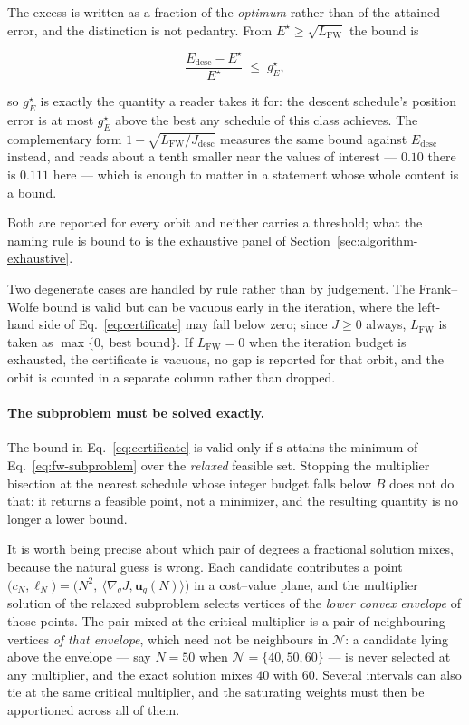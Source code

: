 The excess is written as a fraction of the \emph{optimum} rather than of the
attained error, and the distinction is not pedantry. From
$E^{\star}\ge\sqrt{L_{\mathrm{FW}}}$ the bound is

\begin{equation}
  \frac{E_{\mathrm{desc}}-E^{\star}}{E^{\star}} \;\le\; g_E^{\star} ,
  \label{eq:relative-excess}
\end{equation}

so $g_E^{\star}$ is exactly the quantity a reader takes it for: the descent
schedule's position error is at most $g_E^{\star}$ above the best any schedule
of this class achieves. The complementary form
$1-\sqrt{L_{\mathrm{FW}}/J_{\mathrm{desc}}}$ measures the same bound against
$E_{\mathrm{desc}}$ instead, and reads about a tenth smaller near the values of
interest --- $0.10$ there is $0.111$ here --- which is enough to matter in a
statement whose whole content is a bound.

Both are reported for every orbit and neither carries a threshold; what the
naming rule is bound to is the exhaustive panel of
Section~\ref{sec:algorithm-exhaustive}.

Two degenerate cases are handled by rule rather than by judgement. The
Frank--Wolfe bound is valid but can be vacuous early in the iteration, where
the left-hand side of Eq.~\eqref{eq:certificate} may fall below zero; since
$J\ge0$ always, $L_{\mathrm{FW}}$ is taken as
$\max\{0,\ \text{best bound}\}$. If $L_{\mathrm{FW}}=0$ when the iteration
budget is exhausted, the certificate is vacuous, no gap is reported for that
orbit, and the orbit is counted in a separate column rather than dropped.

\paragraph{The subproblem must be solved exactly.} The bound in
Eq.~\eqref{eq:certificate} is valid only if $\mathbf s$ attains the minimum of
Eq.~\eqref{eq:fw-subproblem} over the \emph{relaxed} feasible set. Stopping the
multiplier bisection at the nearest schedule whose integer budget falls below
$B$ does not do that: it returns a feasible point, not a minimizer, and the
resulting quantity is no longer a lower bound.

It is worth being precise about which pair of degrees a fractional solution
mixes, because the natural guess is wrong. Each candidate contributes a point
$\bigl(c_N,\ell_N\bigr)=\bigl(N^2,\ \langle\nabla_q J,\mathbf u_q(N)\rangle
\bigr)$ in a cost--value plane, and the multiplier solution of the relaxed
subproblem selects vertices of the \emph{lower convex envelope} of those
points. The pair mixed at the critical multiplier is a pair of neighbouring
vertices \emph{of that envelope}, which need not be neighbours in
$\mathcal{N}$: a candidate lying above the envelope --- say $N=50$ when
$\mathcal{N}=\{40,50,60\}$ --- is never selected at any multiplier, and the
exact solution mixes $40$ with $60$. Several intervals can also tie at the
same critical multiplier, and the saturating weights must then be apportioned
across all of them.

